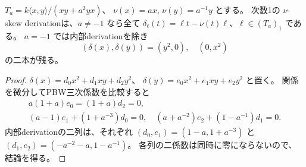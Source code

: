 \begin{lemma}
\label{lem:h3-order2-skew-derivation-resonance}
$T_a=k\langle x,y\rangle/(xy+a^2yx)$、
$\nu(x)=ax$, $\nu(y)=a^{-1}y$ とする。
次数1の $\nu$-skew derivationは、$a\ne-1$ なら全て
$\delta_\ell(t)=\ell t-\nu(t)\ell$、$\ell\in(T_a)_1$ である。
$a=-1$ では内部derivationを除き
\[
 (\delta(x),\delta(y))=(y^2,0),\quad(0,x^2)
\]
の二本が残る。
\end{lemma}
\begin{proof}
$\delta(x)=d_0x^2+d_1xy+d_2y^2$、
$\delta(y)=e_0x^2+e_1xy+e_2y^2$ と置く。
関係を微分してPBW三次係数を比較すると
\[
\begin{gathered}
 a(1+a)e_0=(1+a)d_2=0,\\
 (a-1)e_1+(1+a^{-3})d_0=0,\quad
 (a+a^{-2})e_2+(1-a^{-1})d_1=0.
\end{gathered}
\]
内部derivationの二列は、それぞれ $(d_0,e_1)=(1-a,1+a^{-3})$ と
$(d_1,e_2)=(-a^{-2}-a,1-a^{-1})$。
各列の二係数は同時に零にならないので、結論を得る。
\end{proof}

